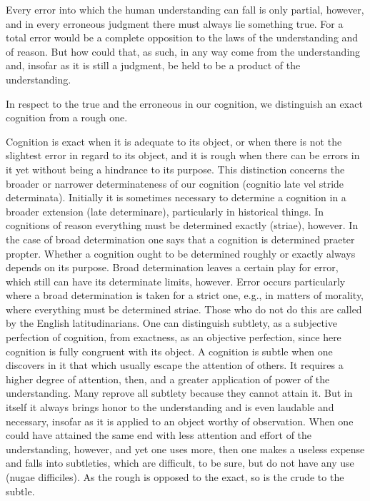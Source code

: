     Every error into which
    the human understanding can fall is only partial, however,
    and in every erroneous judgment
    there must always lie something true.
    For a total error would be a complete opposition to
    the laws of the understanding and of reason.
    But how could that, as such, in any way come from the understanding
    and, insofar as it is still a judgment,
    be held to be a product of the understanding.

    In respect to the true and the erroneous in our cognition,
    we distinguish an exact cognition from a rough one.

        Cognition is exact when it is adequate to its object, or
        when there is not the slightest error in regard to its object,
        and it is rough when there can be errors in it yet
        without being a hindrance to its purpose.
        This distinction concerns the broader or narrower determinateness
        of our cognition (cognitio late vel stride determinata).
        Initially it is sometimes necessary to determine a cognition
        in a broader extension (late determinare),
        particularly in historical things.
        In cognitions of reason everything must be
        determined exactly (striae), however.
        In the case of broad determination
        one says that a cognition is determined praeter propter.
        Whether a cognition ought to be determined roughly or exactly
        always depends on its purpose.
        Broad determination leaves a certain play for error,
        which still can have its determinate limits, however.
        Error occurs particularly where a broad determination
        is  taken for a strict one,
        e.g., in matters of morality,
        where everything must be determined striae.
        Those who do not do this are called by the English latitudinarians.
        One can distinguish subtlety, as a subjective perfection of cognition,
        from exactness, as an objective perfection,
        since here cognition is fully congruent with its object.
        A cognition is subtle when one discovers in it
        that which usually escape the attention of others.
        It requires a higher degree of attention, then,
        and a greater application of power of the understanding.
        Many reprove all subtlety because they cannot attain it.
        But in itself it always brings honor to the understanding
        and is even laudable and necessary,
        insofar as it is applied to an object worthy of observation.
        When one could have attained the same end
        with less attention and effort of the understanding, however,
        and yet one uses more, then one makes a useless expense
        and falls into subtleties, which are difficult, to be sure,
        but do not have any use (nugae difficiles).
        As the rough is opposed to the exact,
         so is the crude to the subtle.

